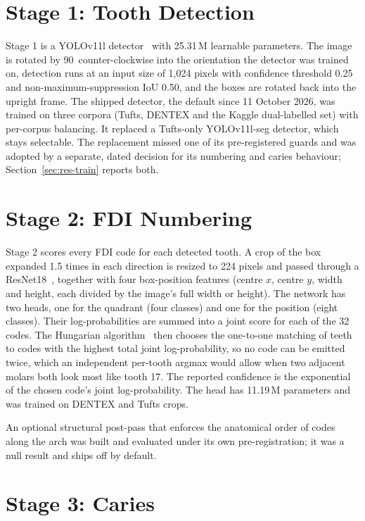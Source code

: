 \section{Stage 1: Tooth Detection}

Stage 1 is a YOLOv11l detector~\cite{jocher2024yolo11} with 25.31\,M learnable parameters. The image is
rotated by 90\textdegree\ counter-clockwise into the orientation the detector was trained on, detection
runs at an input size of 1,024 pixels with confidence threshold 0.25 and non-maximum-suppression IoU
0.50, and the boxes are rotated back into the upright frame. The shipped detector, the default since
11 October 2026, was trained on three corpora (Tufts, DENTEX and the Kaggle dual-labelled set) with
per-corpus balancing. It replaced a Tufts-only YOLOv11l-seg detector, which stays selectable. The
replacement missed one of its pre-registered guards and was adopted by a separate, dated decision for
its numbering and caries behaviour; Section~\ref{sec:res-train} reports both. %

\section{Stage 2: FDI Numbering}

Stage 2 scores every FDI code for each detected tooth. A crop of the box expanded 1.5 times in each
direction is resized to 224 pixels and passed through a ResNet18~\cite{he2016resnet}, together with four
box-position features (centre $x$, centre $y$, width and height, each divided by the image's full
width or height). The network has two heads, one for the quadrant (four classes) and one for the
position (eight classes). Their log-probabilities are summed into a joint score for each of the 32
codes. The Hungarian algorithm~\cite{kuhn1955hungarian} then chooses the one-to-one matching of teeth to
codes with the highest total joint log-probability, so no code can be emitted twice, which an
independent per-tooth argmax would allow when two adjacent molars both look most like tooth 17. The
reported confidence is the exponential of the chosen code's joint log-probability. The head has
11.19\,M parameters and was trained on DENTEX and Tufts crops.

An optional structural post-pass that enforces the anatomical order of codes along the arch was built
and evaluated under its own pre-registration; it was a null result and ships off by default.

\section{Stage 3: Caries}

